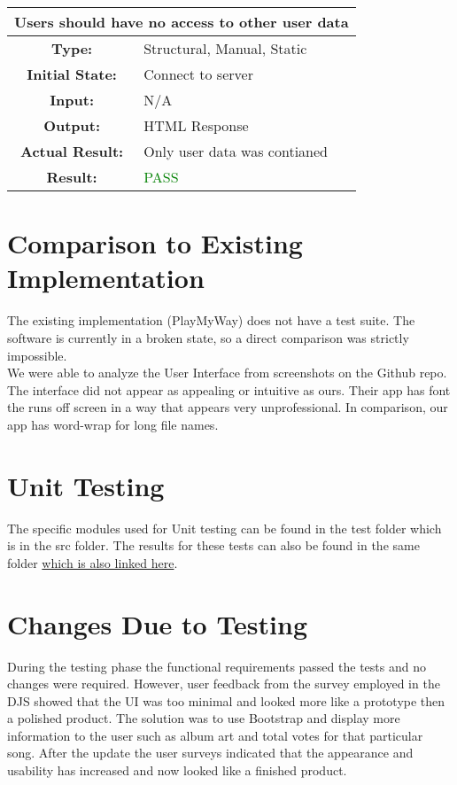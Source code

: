 \documentclass[12pt, titlepage]{article}
\begin{document}
\begin{center}
\begin{table}[H]
\begin{tabularx}{\textwidth}{| c X |}
\hline
\multicolumn{2}{|c|}{\textbf{Users should have no access to other user data}}\\
\hline
\textbf{Type: } & Structural, Manual, Static\\
\textbf{Initial State: } & Connect to server\\
\textbf{Input: } & N/A\\
\textbf{Output: } & HTML Response \\
\textbf{Actual Result:  } & Only user data was contianed \\
\textbf{Result: } & \textcolor{green}{PASS}\\
\hline
\end{tabularx}
\end{table}
\end{center}

\section{Comparison to Existing Implementation}
The existing implementation (PlayMyWay) does not have a test suite. The software is currently in a broken state, so a direct comparison was strictly impossible.\\

We were able to analyze the User Interface from screenshots on the Github repo. The interface did not appear as appealing or intuitive as ours. Their app has font the runs off screen in a way that appears very unprofessional. In comparison, our app has word-wrap for long file names.\\

\section{Unit Testing}
The specific modules used for Unit testing can be found in the test folder which is in the src folder. The results for these tests can also be found in the same folder \href{run:../../src/test/Test-Report-001-12-1-2016.PNG}{which is also linked here}.

\section{Changes Due to Testing}
During the testing phase the functional requirements passed the tests and no changes were required. However, user feedback from the survey employed in the DJS showed that the UI was too minimal and looked more like a prototype then a polished product. The solution was to use Bootstrap and display more information to the user such as album art and total votes for that particular song. After the update the user surveys indicated that the appearance and usability has increased and now looked like a finished product.
\end{document}
